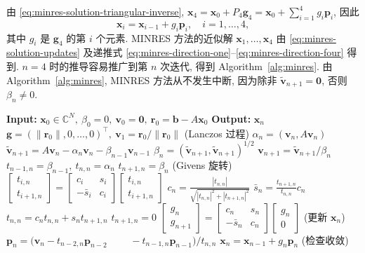 {由 \eqref{eq:minres-solution-triangular-inverse}, $\bm x_4=\bm x_0+P_4\bm g_4=\bm x_0+\sum_{i=1}^4g_i\bm p_i$, 因此}
\begin{equation}\label{eq:minres-solution-updates}\bm x_i=\bm x_{i-1}+g_i\bm p_i,\quad i=1,\ldots,4,\end{equation}
{其中 $g_i$ 是 $\bm g_4$ 的第 $i$ 个元素. MINRES 方法的近似解 $\bm x_1,\ldots,\bm x_4$ 由 \eqref{eq:minres-solution-updates} 及递推式 \eqref{eq:minres-direction-one}--\eqref{eq:minres-direction-four} 得到. $n=4$ 时的推导容易推广到第 $n$ 次迭代, 得到 Algorithm\ \ref{alg:minres}. 由 Algorithm\ \ref{alg:minres}, MINRES 方法从不发生中断, 因为除非 $\widetilde{\bm v}_{n+1}=\bm0$, 否则 $\beta_n\ne0$.}
\begin{algorithm}[H]\caption{{MINRES 方法}}\label{alg:minres}\begin{algorithmic}[1]
\Statex\textbf{Input:} $\bm x_0\in\mathbb C^N,\ \beta_0=0,\ \bm v_0=\bm0,\ \bm r_0=\bm b-A\bm x_0$
\Statex\textbf{Output:} $\bm x_n$
\State $\bm g=(\|\bm r_0\|,0,\ldots,0)^{\top},\ \bm v_1=\bm r_0/\|\bm r_0\|$
\State (Lanczos {过程})
\State $\alpha_n=(\bm v_n,A\bm v_n)$
\State $\widetilde{\bm v}_{n+1}=A\bm v_n-\alpha_n\bm v_n-\beta_{n-1}\bm v_{n-1}$
\State $\beta_n=(\widetilde{\bm v}_{n+1},\widetilde{\bm v}_{n+1})^{1/2}$
\State $\bm v_{n+1}=\widetilde{\bm v}_{n+1}/\beta_n$
\State $t_{n-1,n}=\beta_{n-1},\ t_{n,n}=\alpha_n$
\State $t_{n+1,n}=\beta_n$
\State (Givens {旋转})
\State $\begin{bmatrix}t_{i,n}\\t_{i+1,n}\end{bmatrix}=\begin{bmatrix}c_i&s_i\\-\bar s_i&c_i\end{bmatrix}\begin{bmatrix}t_{i,n}\\t_{i+1,n}\end{bmatrix}$
\EndFor
\State $c_n=\frac{|t_{n,n}|}{\sqrt{|t_{n,n}|^2+|t_{n+1,n}|^2}}$
\State $\bar s_n=\frac{t_{n+1,n}}{t_{n,n}}c_n$
\State $t_{n,n}=c_nt_{n,n}+s_nt_{n+1,n}$
\State $t_{n+1,n}=0$
\State $\begin{bmatrix}g_n\\g_{n+1}\end{bmatrix}=\begin{bmatrix}c_n&s_n\\-\bar s_n&c_n\end{bmatrix}\begin{bmatrix}g_n\\0\end{bmatrix}$
\State ({更新} $\bm x_n$)
\State $\bm p_n=(\bm v_n-t_{n-2,n}\bm p_{n-2}$
\State $\qquad-t_{n-1,n}\bm p_{n-1})/t_{n,n}$
\State $\bm x_n=\bm x_{n-1}+g_n\bm p_n$
\State ({检查收敛})
\EndFor\end{algorithmic}\end{algorithm}
